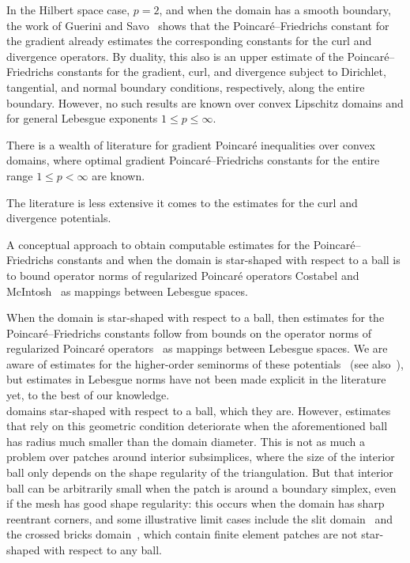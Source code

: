 In the Hilbert space case, $p=2$, and when the domain has a smooth boundary, the work of Guerini and Savo~\cite{guerini2004eigenvalue} shows that the Poincar\'e--Friedrichs constant for the gradient already estimates the corresponding constants for the curl and divergence operators. 
By duality, this also is an upper estimate of the Poincar\'e--Friedrichs constants for the gradient, curl, and divergence subject to Dirichlet, tangential, and normal boundary conditions, respectively, along the entire boundary. 
However, no such results are known over convex Lipschitz domains and for general Lebesgue exponents $1 \leq p \leq \infty$.


There is a wealth of literature for gradient Poincar\'e inequalities over convex domains, where optimal gradient Poincar\'e--Friedrichs constants for the entire range $1 \leq p < \infty$ are known.




The literature is less extensive it comes to the estimates for the curl and divergence potentials.



A conceptual approach to obtain computable estimates for the Poincar\'e--Friedrichs constants  and when the domain is star-shaped with respect to a ball is to bound operator norms of 
regularized Poincar\'e operators  Costabel and McIntosh~\cite{costabel2010bogovskiui} as mappings between Lebesgue spaces. 

When the domain is star-shaped with respect to a ball, 
then estimates for the Poincar\'e--Friedrichs constants 
follow from bounds on the operator norms of regularized Poincar\'e operators~\cite{costabel2010bogovskiui}
as mappings between Lebesgue spaces. 
We are aware of estimates for the higher-order seminorms of these potentials~\cite{guzman2021estimation} (see also~\cite{gallistl2023computational}),
but estimates in Lebesgue norms have not been made explicit in the literature yet, to the best of our knowledge.
\\



 domains star-shaped with respect to a ball, which they are. 
However, estimates that rely on this geometric condition deteriorate when the aforementioned ball has radius much smaller than the domain diameter. 
This is not as much a problem over patches around interior subsimplices, where the size of the interior ball only depends on the shape regularity of the triangulation. 
But that interior ball can be arbitrarily small when the patch is around a boundary simplex, even if the mesh has good shape regularity: 
this occurs when the domain has sharp reentrant corners, and some illustrative limit cases include the slit domain~\cite{veeser2012poincare} and the crossed bricks domain~\cite{licht2019smoothed}, 
which contain finite element patches are not star-shaped with respect to any ball. 

